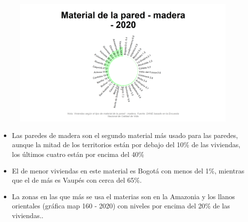    \begin{figure}[H]
        \caption[Viviendas con pared de madera por departamentos para 2020 ]{\label{pared_madera_dptos} }
        \begin{center}
        \includegraphics[width=\textwidth,keepaspectratio]{img/var_160_static.png}
        \end{center}
    \end{figure}
            \begin{itemize}
                    \item Las paredes de madera son el segundo material más usado para las paredes, aunque la mitad de los territorios están por debajo del 10\% de las viviendas, los últimos cuatro están por encima del 40\%
                    \item El de menor viviendas en este material es Bogotá con menos del 1\%, mientras que el de más es Vaupés con cerca del 65\%.
                    \item La zonas en las que más se usa el materias son en la Amazonia y los llanos orientales (gráfica map 160 - 2020) con niveles por encima del 20\% de las viviendas..
                    \end{itemize}

